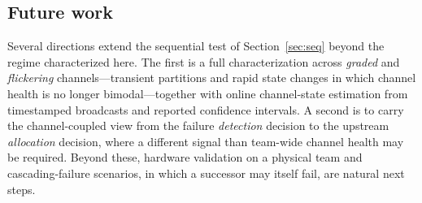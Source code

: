 \documentclass[conference]{IEEEtran}
\begin{document}
\subsection{Future work}
\label{sec:future}
Several directions extend the sequential test of Section~\ref{sec:seq} beyond the
regime characterized here. The first is a full characterization across
\emph{graded} and \emph{flickering} channels---transient partitions and rapid
state changes in which channel health is no longer bimodal---together with online
channel-state estimation from timestamped broadcasts and reported confidence
intervals. A second is to carry the channel-coupled view from the failure
\emph{detection} decision to the upstream \emph{allocation} decision, where a
different signal than team-wide channel health may be required. Beyond these,
hardware validation on a physical team and cascading-failure scenarios, in which
a successor may itself fail, are natural next steps.



\end{document}
